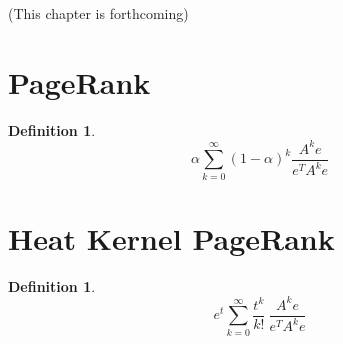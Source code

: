 \documentclass[a4,11pt,twoside,leqno]{report}
\theoremstyle{definition}
\newtheorem{defn}[thm]{Definition}
\theoremstyle{remark}
\numberwithin{equation}{section}
\begin{document}
(This chapter is forthcoming)

\section{PageRank}

\begin{defn}

$$\alpha \displaystyle \sum_{k=0}^{\infty} (1-\alpha)^k \frac{A^ke}{e^TA^ke}$$

\end{defn}

\section{Heat Kernel PageRank}

\begin{defn} 

$$e^t \displaystyle \sum_{k=0}^{\infty} \frac{t^k}{k!} \ \frac{A^ke}{e^TA^ke}$$

\end{defn}
\end{document}
